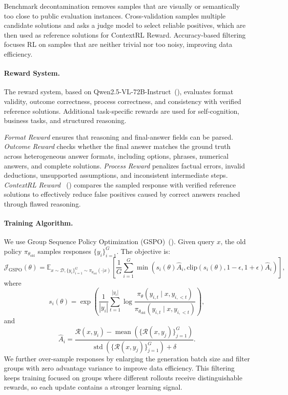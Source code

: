 \documentclass{llmxive}
\begin{document}
Benchmark decontamination removes samples that are visually or semantically too close to public evaluation instances. Cross-validation samples multiple candidate solutions and asks a judge model to select reliable positives, which are then used as reference solutions for ContextRL Reward. Accuracy-based filtering focuses RL on samples that are neither trivial nor too noisy, improving data efficiency.

\paragraph{Reward System.}
The reward system, based on Qwen2.5-VL-72B-Instruct~(\cite{qwen2_5_vl}), evaluates format validity, outcome correctness, process correctness, and consistency with verified reference solutions. Additional task-specific rewards are used for self-cognition, business tasks, and structured reasoning.

\textit{Format Reward} ensures that reasoning and final-answer fields can be parsed. \textit{Outcome Reward} checks whether the final answer matches the ground truth across heterogeneous answer formats, including options, phrases, numerical answers, and complete solutions. \textit{Process Reward} penalizes factual errors, invalid deductions, unsupported assumptions, and inconsistent intermediate steps. \textit{ContextRL Reward} ~(\cite{lu2026contextrl}) compares the sampled response with verified reference solutions to effectively reduce false positives caused by correct answers reached through flawed reasoning.

\paragraph{Training Algorithm.}
We use Group Sequence Policy Optimization (GSPO)~(\cite{zheng2025gspo}). Given query $x$, the old policy $\pi_{\theta_{\mathrm{old}}}$ samples responses $\{y_i\}_{i=1}^{G}$. The objective is:
\begin{equation}
\mathcal{J}_{\mathrm{GSPO}}(\theta) =
\mathbb{E}_{x \sim \mathcal{D}, \{y_i\}_{i=1}^{G} \sim \pi_{\theta_{\mathrm{old}}}(\cdot | x)}
\left[
\frac{1}{G}
\sum_{i=1}^{G}
\min
\left(
s_i(\theta)\hat{A}_i,
\mathrm{clip}\left(s_i(\theta), 1-\epsilon, 1+\epsilon\right)\hat{A}_i
\right)
\right],
\end{equation}
where
\begin{equation}
s_i(\theta) =
\exp
\left(
\frac{1}{|y_i|}
\sum_{t=1}^{|y_i|}
\log
\frac{
\pi_{\theta}(y_{i,t}\mid x, y_{i,<t})
}{
\pi_{\theta_{\mathrm{old}}}(y_{i,t}\mid x, y_{i,<t})
}
\right),
\end{equation}
and
\begin{equation}
\hat{A}_i =
\frac{
\mathcal{R}(x, y_i) -
\operatorname{mean}\left(\{\mathcal{R}(x, y_j)\}_{j=1}^{G}\right)
}{
\operatorname{std}\left(\{\mathcal{R}(x, y_j)\}_{j=1}^{G}\right) + \delta
}.
\end{equation}
We further over-sample responses by enlarging the generation batch size and filter groups with zero advantage variance to improve data efficiency.
This filtering keeps training focused on groups where different rollouts receive distinguishable rewards, so each update contains a stronger learning signal.
\end{document}
